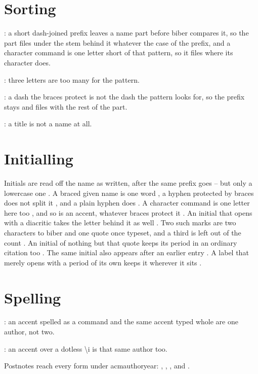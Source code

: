 \documentclass[acmsmall,nonacm,natbib=false]{acmart}
\begin{document}
\thispagestyle{empty}

\section*{Sorting}
\cite{NsAbe,NsAeZed,NsDeZed,NsAlHakim,NsFox}: a short dash-joined prefix leaves a name part before biber compares it, so the part files under the stem behind it whatever the case of the prefix, and a character command is one letter short of that pattern, so it files where its character does.

\cite{NsIbnSina}: three letters are too many for the pattern.

\cite{NsAbe,NsProt,NsFox}: a dash the braces protect is not the dash the pattern looks for, so the prefix stays and files with the rest of the part.

\cite{NsTitle}: a title is not a name at all.

\section*{Initialling}
Initials are read off the name as written, after the same prefix goes -- but only a lowercase one \citeauthor{NiNoinit} \citeauthor{NiQuirk} \citeauthor{NiUpper} \citeauthor{NiRho}.
A braced given name is one word \citeauthor{NiBraced} \citeauthor{NiSage}, a hyphen protected by braces does not split it \citeauthor{NiProtect} \citeauthor{NiTell}, and a plain hyphen does \citeauthor{NiHyphen} \citeauthor{NiVane}.
A character command is one letter here too \citeauthor{NiChar} \citeauthor{NiZeta}, and so is an accent, whatever braces protect it \citeauthor{NiAccent} \citeauthor{NiYew}.
An initial that opens with a diacritic takes the letter behind it as well \citeauthor{NiAli} \citeauthor{NiWard}.
Two such marks are two characters to biber and one quote once typeset, and a third is left out of the count \citeauthor{NiAliTwo} \citeauthor{NiXuThree} \citeauthor{NiXu}.
An initial of nothing but that quote keeps its period in an ordinary citation too \cite{NiAliTwo,NiAli,NiWard}.
The same initial also appears after an earlier entry \cite{NsAbe,NiAliTwo}.
A label that merely opens with a period of its own keeps it wherever it sits \cite{NzBang,NzDotNet}.

\section*{Spelling}
\cite{NzEsc,NzLit}: an accent spelled as a command and the same accent typed whole are one author, not two.

\cite{NzDotless,NzDotted}: an accent over a dotless \textbackslash{}i is that same author too.

Postnotes reach every form under acmauthoryear: \cite[p.~5]{NsAbe}, \textcite[p.~5]{NsAbe}, \citeauthor[p.~5]{NsAbe}, and \citeyear[p.~5]{NsAbe}.

\printbibliography
\end{document}
